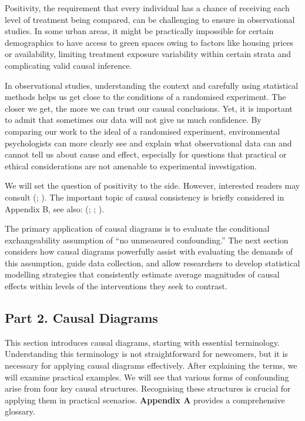 \documentclass[
  singlecolumn]{article}
\begin{document}
Positivity, the requirement that every individual has a chance of
receiving each level of treatment being compared, can be challenging to
ensure in observational studies. In some urban areas, it might be
practically impossible for certain demographics to have access to green
spaces owing to factors like housing prices or availability, limiting
treatment exposure variability within certain strata and complicating
valid causal inference.

In observational studies, understanding the context and carefully using
statistical methods helps us get close to the conditions of a randomised
experiment. The closer we get, the more we can trust our causal
conclusions. Yet, it is important to admit that sometimes our data will
not give us much confidence. By comparing our work to the ideal of a
randomised experiment, environmental psychologists can more clearly see
and explain what observational data can and cannot tell us about cause
and effect, especially for questions that practical or ethical
considerations are not amenable to experimental investigation.

We will set the question of positivity to the side. However, interested
readers may consult (;
). The important
topic of causal consistency is briefly considered in Appendix B, see
also: (;
;
).

The primary application of causal diagrams is to evaluate the
conditional exchangeability assumption of ``no unmeasured confounding.''
The next section considers how causal diagrams powerfully assist with
evaluating the demands of this assumption, guide data collection, and
allow researchers to develop statistical modelling strategies that
consistently estimate average magnitudes of causal effects within levels
of the interventions they seek to contrast.

\subsection{Part 2. Causal Diagrams}\label{part-2.-causal-diagrams}

This section introduces causal diagrams, starting with essential
terminology. Understanding this terminology is not straightforward for
newcomers, but it is necessary for applying causal diagrams effectively.
After explaining the terms, we will examine practical examples. We will
see that various forms of confounding arise from four key causal
structures. Recognising these structures is crucial for applying them in
practical scenarios. \textbf{Appendix A} provides a comprehensive
glossary.
\end{document}
